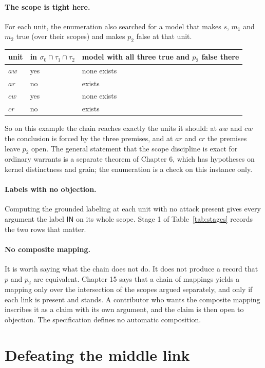\documentclass[11pt]{article}
\newcommand{\IN}{\textsf{IN}}
\begin{document}
\paragraph{The scope is tight here.} For each unit, the enumeration also searched for a model that makes $s$, $m_1$ and $m_2$ true (over their scopes) and makes $p_2$ false at that unit.
\begin{center}
\begin{tabular}{@{}lll@{}}
\toprule
unit & in $\sigma_0\cap\tau_1\cap\tau_2$ & model with all three true and $p_2$ false there\\
\midrule
$aw$ & yes & none exists\\
$ar$ & no & exists\\
$cw$ & yes & none exists\\
$cr$ & no & exists\\
\bottomrule
\end{tabular}
\end{center}
So on this example the chain reaches exactly the units it should: at $aw$ and $cw$ the conclusion is forced by the three premises, and at $ar$ and $cr$ the premises leave $p_2$ open. The general statement that the scope discipline is exact for ordinary warrants is a separate theorem of Chapter 6, which has hypotheses on kernel distinctness and grain; the enumeration is a check on this instance only.

\paragraph{Labels with no objection.} Computing the grounded labeling at each unit with no attack present gives every argument the label $\IN$ on its whole scope. Stage 1 of Table~\ref{tab:stages} records the two rows that matter.

\paragraph{No composite mapping.} It is worth saying what the chain does not do. It does not produce a record that $p$ and $p_2$ are equivalent. Chapter 15 says that a chain of mappings yields a mapping only over the intersection of the scopes argued separately, and only if each link is present and stands. A contributor who wants the composite mapping inscribes it as a claim with its own argument, and the claim is then open to objection. The specification defines no automatic composition.

\section{Defeating the middle link}\label{sec:defeat}
\end{document}
